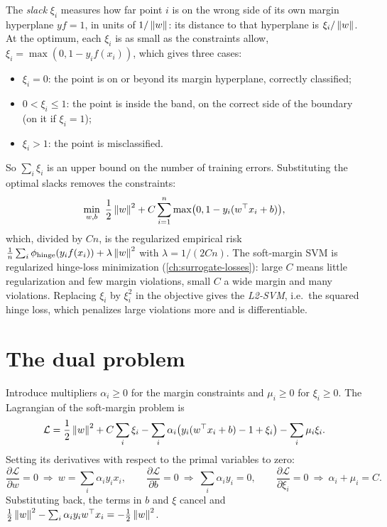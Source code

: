 \begin{notechapter}
The \emph{slack} $\xi_i$ measures how far point $i$ is on the wrong side of its own margin
hyperplane $yf = 1$, in units of $1/\left\|w\right\|$: its distance to that hyperplane is $\xi_i/\left\|w\right\|$. At the
optimum, each $\xi_i$ is as small as the constraints allow, $\xi_i = \max(0, 1 - y_if(x_i))$, which gives
three cases:
\begin{itemize}[nosep]
  \item $\xi_i = 0$: the point is on or beyond its margin hyperplane, correctly classified;
  \item $0<\xi_i\leq1$: the point is inside the band, on the correct side of the boundary (on it
        if $\xi_i = 1$);
  \item $\xi_i>1$: the point is misclassified.
\end{itemize}
So $\sum_i\xi_i$ is an upper bound on the number of training errors. Substituting the optimal
slacks removes the constraints:
\[
  \min_{w, b}\ \frac12\left\|w\right\|^2 + C\sum_{i=1}^n\max\bigl(0, 1 - y_i(w^\top x_i + b)\bigr),
\]
which, divided by $Cn$, is the regularized empirical risk
$\frac1n\sum_i\phi_{\mathrm{hinge}}(y_if(x_i)) + \lambda\left\|w\right\|^2$ with $\lambda = 1/(2Cn)$. The soft-margin SVM is regularized
hinge-loss minimization (\cref{ch:surrogate-losses}): large $C$ means little regularization and
few margin violations, small $C$ a wide margin and many violations. Replacing $\xi_i$ by $\xi_i^2$
in the objective gives the \emph{L2-SVM}, i.e.\ the squared hinge loss, which penalizes
large violations more and is differentiable.

\section{The dual problem}\label{svm:sec:dual}

Introduce multipliers $\alpha_i\geq0$ for the margin constraints and $\mu_i\geq0$ for $\xi_i\geq0$. The
Lagrangian of the soft-margin problem is
\[
  \mathcal L = \frac12\left\|w\right\|^2 + C\sum_i\xi_i - \sum_i\alpha_i\bigl(y_i(w^\top x_i + b) - 1 + \xi_i\bigr) - \sum_i\mu_i\xi_i .
\]
Setting its derivatives with respect to the primal variables to zero:
\[
  \frac{\partial\mathcal L}{\partial w} = 0\ \Rightarrow\ w = \sum_i\alpha_iy_ix_i,\qquad
  \frac{\partial\mathcal L}{\partial b} = 0\ \Rightarrow\ \sum_i\alpha_iy_i = 0,\qquad
  \frac{\partial\mathcal L}{\partial\xi_i} = 0\ \Rightarrow\ \alpha_i + \mu_i = C .
\]
Substituting back, the terms in $b$ and $\xi$ cancel and $\frac12\left\|w\right\|^2 - \sum_i\alpha_iy_iw^\top x_i = -\frac12\left\|w\right\|^2$.


\end{notechapter}
